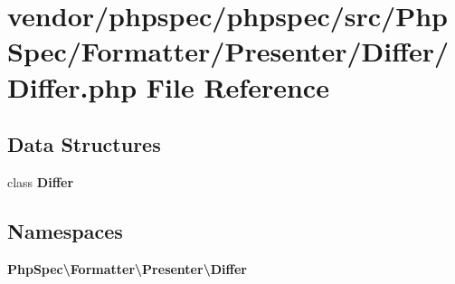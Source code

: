 \section{vendor/phpspec/phpspec/src/\+Php\+Spec/\+Formatter/\+Presenter/\+Differ/\+Differ.php File Reference}
\label{phpspec_2phpspec_2src_2_php_spec_2_formatter_2_presenter_2_differ_2_differ_8php}
\subsection*{Data Structures}
\begin{DoxyCompactItemize}
\item 
class {\bf Differ}
\end{DoxyCompactItemize}
\subsection*{Namespaces}
\begin{DoxyCompactItemize}
\item 
 {\bf Php\+Spec\textbackslash{}\+Formatter\textbackslash{}\+Presenter\textbackslash{}\+Differ}
\end{DoxyCompactItemize}
